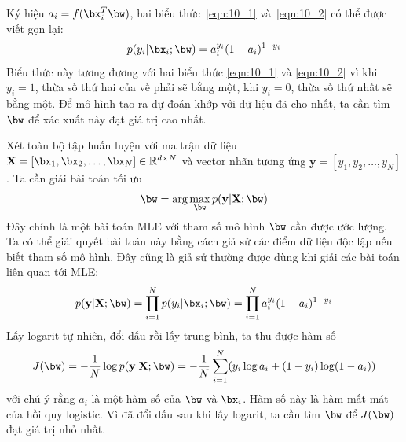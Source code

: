 Ký hiệu $a_i = f(\bx_i^T\bw)$, hai biểu thức~\eqref{eqn:10_1} và~\eqref{eqn:10_2} có thể được viết gọn lại:
\begin{equation} 
p(y_i| \bx_i; \bw) = a_i^{y_i}(1 - a_i)^{1- y_i} 
\end{equation}  
Biểu thức này tương đương với hai biểu thức \eqref{eqn:10_1} và
\eqref{eqn:10_2} vì khi $y_i=1$, thừa số thứ hai của vế phải sẽ bằng một,
khi $y_i = 0$, thừa số thứ nhất sẽ bằng một. Để mô hình tạo ra dự đoán khớp với dữ
liệu đã cho nhất, ta cần tìm $\bw$ để xác xuất này đạt giá trị cao nhất. 
 
Xét toàn bộ tập huấn luyện với ma trận dữ liệu $\mathbf{X} =
[\bx_1,\bx_2, \dots, \bx_N] \in \mathbb{R}^{d \times N}$ và
vector nhãn tương ứng $\mathbf{y} = [y_1, y_2, \dots, y_N]$. Ta
cần giải bài toán tối ưu%
\begin{equation} 
\label{eqn:10_1_7}
\bw = \arg\max_{\bw} p(\mathbf{y}|\mathbf{X}; \bw) 
\end{equation} 
Đây chính là một bài toán MLE với tham số mô hình
$\bw$ cần được ước lượng. Ta có thể giải quyết bài toán này bằng cách giả sử các điểm dữ liệu độc lập nếu biết tham số mô hình. Đây cũng là giả sử thường được dùng khi giải các bài toán liên quan tới MLE:
\begin{equation} 
p(\mathbf{y}|\mathbf{X}; \bw) = \prod_{i=1}^N p(y_i| \bx_i; \bw) 
= \prod_{i=1}^N a_i^{y_i}(1 - a_i)^{1- y_i} 
\end{equation} 
Lấy logarit tự nhiên, đổi dấu rồi lấy trung bình, ta thu được hàm số 
\begin{equation} 
J(\bw) = -\frac{1}{N}\log p(\mathbf{y}|\mathbf{X}; \bw) 
= -\frac{1}{N}\sum_{i=1}^N(y_i \log a_i + (1-y_i) \log (1 - a_i)) 
\end{equation} 
với chú ý rằng $a_i$ là một hàm số của $\bw$ và $\bx_i$. Hàm số này là hàm mất
mát của hồi quy logistic. Vì đã đổi dấu sau khi lấy logarit, ta cần tìm $\bw$ để
$J(\bw)$ đạt giá trị nhỏ nhất.

